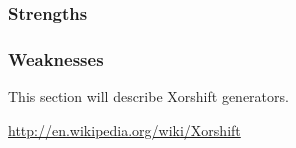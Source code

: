 \subsubsection{Strengths}
\subsubsection{Weaknesses}

This section will describe Xorshift generators.

\url{http://en.wikipedia.org/wiki/Xorshift}
